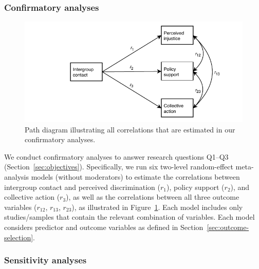 \documentclass[10pt, a4paper]{article}
\begin{document}
\subsubsection{Confirmatory analyses}
\label{sec:confirmatory-analyses}

\begin{figure}
\centering
\includegraphics[scale = 1]{path-diagram}
\caption{Path diagram illustrating all correlations that are estimated in our confirmatory analyses.}
\label{fig:f3}
\end{figure}

We conduct confirmatory analyses to answer research questions Q1--Q3 (Section~\ref{sec:objectives}). Specifically, we run six two-level random-effect meta-analysis models (without moderators) to estimate the correlations between intergroup contact and perceived discrimination ($r_1$), policy support ($r_2$), and collective action ($r_3$), as well as the correlations between all three outcome variables ($r_{12}$, $r_{13}$, $r_{23}$), as illustrated in Figure~\ref{fig:f3}. Each model includes only studies/samples that contain the relevant combination of variables. Each model considers predictor and outcome variables as defined in Section~\ref{sec:outcome-selection}.  

\subsubsection{Sensitivity analyses}
\label{sec:sensitivity-analyses}
\end{document}
